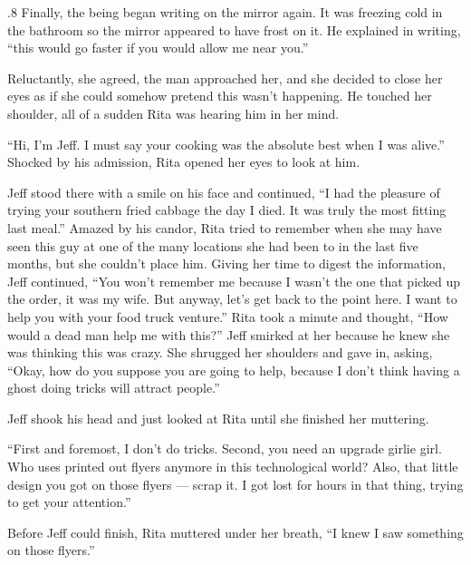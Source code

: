 \documentclass{article}
\begin{document}
\begin{tcolorbox}[colback=white, colframe=my-green, coltitle=black, parskip=5mm, title=
    \textbf{Human-written Story}, breakable]
\begin{spacing}{.8}
        Finally, the being began writing on the mirror again. It was freezing cold in the bathroom so the mirror appeared to have frost on it. He explained in writing, “this would go faster if you would allow me near you.” \\\par
        Reluctantly, she agreed, the man approached her, and she decided to close her eyes as if she could somehow pretend this wasn’t happening. He touched her shoulder, all of a sudden Rita was hearing him in her mind. \\\par
        “Hi, I’m Jeff. I must say your cooking was the absolute best when I was alive.” Shocked by his admission, Rita opened her eyes to look at him. \\\par
        Jeff stood there with a smile on his face and continued, “I had the pleasure of trying your southern fried cabbage the day I died. It was truly the most fitting last meal.” 
        Amazed by his candor, Rita tried to remember when she may have seen this guy at one of the many locations she had been to in the last five months, but she couldn’t place him. Giving her time to digest the information, Jeff continued, “You won’t remember me because I wasn’t the one that picked up the order, it was my wife. But anyway, let’s get back to the point here. I want to help you with your food truck venture.”
        Rita took a minute and thought, “How would a dead man help me with this?” Jeff smirked at her because he knew she was thinking this was crazy. She shrugged her shoulders and gave in, asking, “Okay, how do you suppose you are going to help, because I don’t think having a ghost doing tricks will attract people.” \\\par
        Jeff shook his head and just looked at Rita until she finished her muttering. \\\par
        “First and foremost, I don’t do tricks. Second, you need an upgrade girlie girl. Who uses printed out flyers anymore in this technological world? Also, that little design you got on those flyers — scrap it. I got lost for hours in that thing, trying to get your attention.” \\\par
        Before Jeff could finish, Rita muttered under her breath, “I knew I saw something on those flyers.”\\\par

\end{spacing}
\end{tcolorbox}
\end{document}
